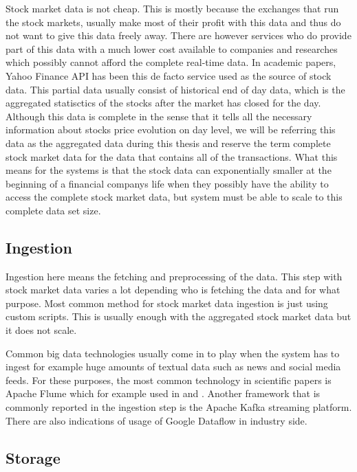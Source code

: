 Stock market data is not cheap.
This is mostly because the exchanges that run the stock markets, usually make most of their profit with this data and thus do not want to give this data freely away.
There are however services who do provide part of this data with a much lower cost available to companies and researches which possibly cannot afford the complete real-time data.
In academic papers, Yahoo Finance API has been this de facto service used as the source of stock data. \cite{islam} \cite{adresic} \cite{le} \cite{serez}
This partial data usually consist of historical end of day data, which is the aggregated statisctics of the stocks after the market has closed for the day.
Although this data is complete in the sense that it tells all the necessary information about stocks price evolution on day level, we will be referring this data as the aggregated data during this thesis and reserve the term complete stock market data for the data that contains all of the transactions.
What this means for the systems is that the stock data can exponentially smaller at the beginning of a financial companys life when they possibly have the ability to access the complete stock market data, but system must be able to scale to this complete data set size.


\subsection{Ingestion}

Ingestion here means the fetching and preprocessing of the data.
This step with stock market data varies a lot depending who is fetching the data and for what purpose.
Most common method for stock market data ingestion is just using custom scripts.
This is usually enough with the aggregated stock market data but it does not scale.

Common big data technologies usually come in to play when the system has to ingest for example huge amounts of textual data such as news and social media feeds.
For these purposes, the most common technology in scientific papers is Apache Flume which for example used in \cite{peng} and \cite{das}.
Another framework that is commonly reported in the ingestion step is the Apache Kafka streaming platform. \cite{chungho} \cite{juan}
There are also indications of usage of Google Dataflow in industry side. \cite{palmer}

\subsection{Storage}

